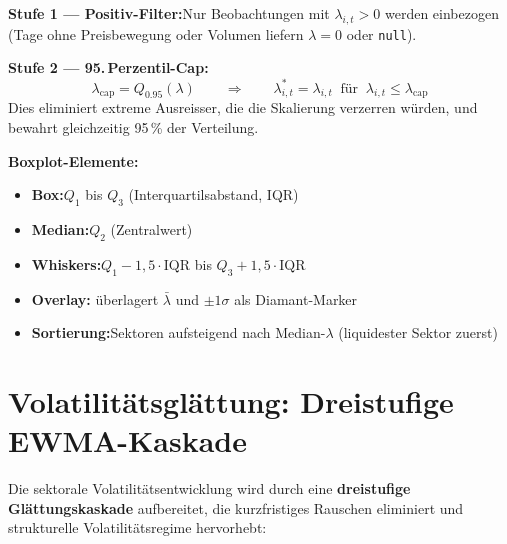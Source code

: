\documentclass[11pt, a4paper, oneside, openany]{report}
\newcommand{\code}[1]{{\codefont\small\textcolor{DeepNavy}{#1}}}
\begin{document}
\begin{mathbox}
\textbf{Stufe 1 --- Positiv-Filter:}\;Nur Beobachtungen mit $\lambda_{i,t} > 0$ werden einbezogen (Tage ohne Preisbewegung oder Volumen liefern $\lambda = 0$ oder \texttt{null}).

\textbf{Stufe 2 --- 95.\,Perzentil-Cap:}
\[
  \lambda_{\text{cap}} = Q_{0.95}(\lambda) \qquad \Rightarrow \qquad \lambda_{i,t}^* = \lambda_{i,t} \;\;\text{für}\;\; \lambda_{i,t} \leq \lambda_{\text{cap}}
\]
Dies eliminiert extreme Ausreisser, die die Skalierung verzerren würden, und bewahrt gleichzeitig 95\,\% der Verteilung.

\textbf{Boxplot-Elemente:}
\begin{itemize}
  \item \textbf{Box:}\;$Q_1$ bis $Q_3$ (Interquartilsabstand, IQR)
  \item \textbf{Median:}\;$Q_2$ (Zentralwert)
  \item \textbf{Whiskers:}\;$Q_1 - 1{,}5 \cdot \text{IQR}$ bis $Q_3 + 1{,}5 \cdot \text{IQR}$
  \item \textbf{Overlay:}\;\code{boxmean=\char`\"sd\char`\"} überlagert $\bar{\lambda}$ und $\pm 1\sigma$ als Diamant-Marker
  \item \textbf{Sortierung:}\;Sektoren aufsteigend nach Median-$\lambda$ (liquidester Sektor zuerst)
\end{itemize}
\end{mathbox}

\section{Volatilitätsglättung: Dreistufige EWMA-Kaskade}
\label{sec:ewma}

Die sektorale Volatilitätsentwicklung wird durch eine \textbf{dreistufige Glättungskaskade} aufbereitet, die kurzfristiges Rauschen eliminiert und strukturelle Volatilitätsregime hervorhebt:
\end{document}
